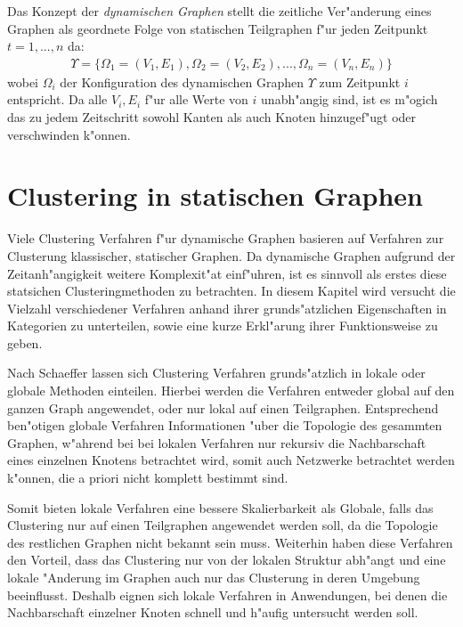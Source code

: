 \documentclass[journal]{vgtc}
\begin{document}
	Das Konzept der \emph{dynamischen Graphen}\cite{modularity} stellt die zeitliche Ver"anderung eines Graphen
	als geordnete Folge von statischen Teilgraphen f"ur jeden Zeitpunkt $t=1,...,n$ da:
	\begin{align}
		\Upsilon=\{\Omega_1=(V_1, E_1), \Omega_2=(V_2, E_2), ..., \Omega_n=(V_n,E_n)\}
	\end{align}
	wobei $\Omega_i$ der Konfiguration des dynamischen Graphen $\Upsilon$ zum Zeitpunkt $i$ entspricht.
	Da alle $V_i, E_i$ f"ur alle Werte von $i$ unabh"angig sind, ist es m"ogich das zu jedem Zeitschritt
	sowohl Kanten als auch Knoten hinzugef"ugt oder verschwinden k"onnen.
  
\section{Clustering in statischen Graphen}
  \label{sec:static_clustering}

  Viele Clustering Verfahren f"ur dynamische Graphen basieren auf Verfahren zur Clusterung klassischer,
  statischer Graphen. Da dynamische Graphen aufgrund der Zeitanh"angigkeit weitere Komplexit"at einf"uhren,
  ist es sinnvoll als erstes diese statsichen Clusteringmethoden zu betrachten.
  In diesem Kapitel wird versucht die Vielzahl verschiedener Verfahren anhand ihrer grunds"atzlichen Eigenschaften
  in Kategorien zu unterteilen, sowie eine kurze Erkl"arung ihrer Funktionsweise zu geben.
  
  Nach Schaeffer \cite{Schaeffer} lassen sich Clustering Verfahren grunds"atzlich in lokale oder globale
  Methoden einteilen. Hierbei werden die Verfahren entweder global auf den ganzen Graph angewendet,
  oder nur lokal auf einen Teilgraphen. Entsprechend ben"otigen globale Verfahren Informationen "uber 
  die Topologie des gesammten Graphen, w"ahrend bei bei lokalen Verfahren nur rekursiv die Nachbarschaft
  eines einzelnen Knotens betrachtet wird, somit auch Netzwerke betrachtet werden k"onnen, die a priori
  nicht komplett bestimmt sind.
  
  Somit bieten lokale Verfahren eine bessere Skalierbarkeit als Globale, falls das Clustering nur
  auf einen Teilgraphen angewendet werden soll, da die Topologie des restlichen Graphen nicht bekannt sein muss.
  Weiterhin haben diese Verfahren den Vorteil, dass das Clustering nur von der lokalen Struktur abh"angt und eine
  lokale "Anderung im Graphen auch nur das Clusterung in deren Umgebung beeinflusst. Deshalb eignen sich lokale
  Verfahren in Anwendungen, bei denen die Nachbarschaft einzelner Knoten schnell und h"aufig untersucht werden soll.
  
\end{document}
